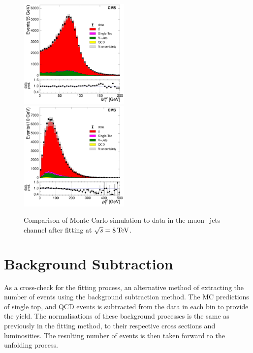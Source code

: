 \begin{figure}[hbtp]
     \includegraphics[width=0.48\textwidth]{Chapters/04_Analysis/04b_XSections/images/control_plots/after_fit/8TeV/MuPlusJets_patType1CorrectedPFMet_MT_2orMoreBtags_with_ratio.pdf}\\     
	 \includegraphics[width=0.48\textwidth]{Chapters/04_Analysis/04b_XSections/images/control_plots/after_fit/8TeV/MuPlusJets_patType1CorrectedPFMet_WPT_2orMoreBtags_with_ratio.pdf}\hfill
	 \caption[Comparison of Monte Carlo simulation to data in the muon+jets channel after fitting at
	 $\roots=8\TeV$.]{Comparison of Monte Carlo simulation to data in the muon+jets channel after fitting at
	 $\roots=8\TeV$.}
     \label{fig:data_mc_comparison_after_fit_8TeV_muon}
\end{figure}

\FloatBarrier

\section{Background Subtraction}
\label{s:background_subtraction}
As a cross-check for the fitting process, an alternative method of extracting the number of \ttbar events
using the background subtraction method. The MC predictions of single top, \VpJets and QCD events is
subtracted from the data in each bin to provide the \ttbar yield. The normalisations of these background
processes is the same as previously in the fitting method, \ie to their respective cross sections and
luminosities. The resulting number of \ttbar events is then taken forward to the unfolding process.

